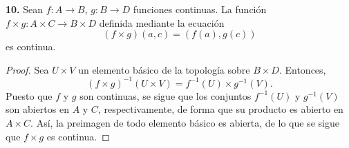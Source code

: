 \documentclass{article}
\begin{document}
\begin{mybox}
	\textbf{10. } Sean $f: A \rightarrow B$, $g: B \rightarrow D$ funciones continuas. La función $f \times g : A \times C \rightarrow B \times D$ definida mediante la ecuación
	$$ (f \times g)(a, c) = (f(a), g(c)) $$
	es continua. 
\end{mybox}	
\begin{proof}
	Sea $U \times V$ un elemento básico de la topología sobre $B \times D$. Entonces, 
	$$ (f \times g)^{-1}(U \times V) = f^{-1}(U) \times g^{-1}(V) .$$
	Puesto que $f$ y $g$ son continuas, se sigue que los conjuntos  $f^{-1}(U)$ y $ g^{-1}(V)$ son abiertos en $A$ y $C$, respectivamente, de forma que su producto es abierto en $A \times C$.  Así, la preimagen de todo elemento básico es abierta, de lo que se sigue que $f \times g$ es continua. 
\end{proof}

\newpage
\end{document}
